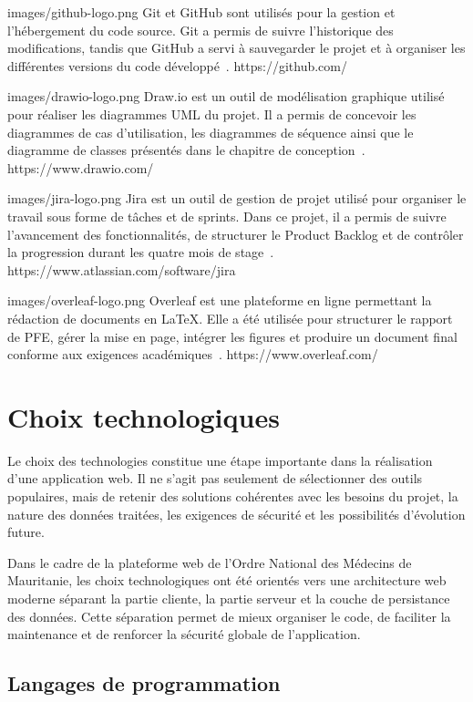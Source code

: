 ﻿\documentclass[12pt,a4paper]{report}
\begin{document}
\outil
{images/github-logo.png}
{Git et GitHub}
{sont utilisés pour la gestion et l'hébergement du code source. Git a permis
de suivre l'historique des modifications, tandis que GitHub a servi à
sauvegarder le projet et à organiser les différentes versions du code
développé~\cite{githubDocs}.}
{https://github.com/}

\outil
{images/drawio-logo.png}
{Draw.io}
{est un outil de modélisation graphique utilisé pour réaliser les diagrammes
UML du projet. Il a permis de concevoir les diagrammes de cas d'utilisation,
les diagrammes de séquence ainsi que le diagramme de classes présentés dans
le chapitre de conception~\cite{drawioDocs}.}
{https://www.drawio.com/}

\outil
{images/jira-logo.png}
{Jira}
{est un outil de gestion de projet utilisé pour organiser le travail sous
forme de tâches et de sprints. Dans ce projet, il a permis de suivre
l'avancement des fonctionnalités, de structurer le Product Backlog et de
contrôler la progression durant les quatre mois de stage~\cite{jiraDocs}.}
{https://www.atlassian.com/software/jira}

\outil
{images/overleaf-logo.png}
{Overleaf}
{est une plateforme en ligne permettant la rédaction de documents en
\LaTeX. Elle a été utilisée pour structurer le rapport de PFE, gérer la mise
en page, intégrer les figures et produire un document final conforme aux
exigences académiques~\cite{overleafDocs}.}
{https://www.overleaf.com/}

\section{Choix technologiques}

Le choix des technologies constitue une étape importante dans la réalisation
d'une application web. Il ne s'agit pas seulement de sélectionner des outils
populaires, mais de retenir des solutions cohérentes avec les besoins du
projet, la nature des données traitées, les exigences de sécurité et les
possibilités d'évolution future.

Dans le cadre de la plateforme web de l'Ordre National des Médecins de
Mauritanie, les choix technologiques ont été orientés vers une architecture
web moderne séparant la partie cliente, la partie serveur et la couche de
persistance des données. Cette séparation permet de mieux organiser le code,
de faciliter la maintenance et de renforcer la sécurité globale de
l'application.

\subsection{Langages de programmation}
\end{document}
